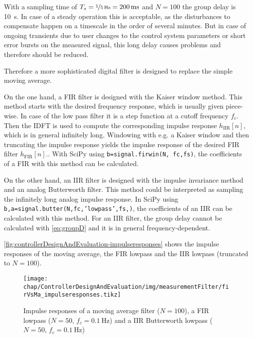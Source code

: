With a sampling time of $T_s=\nicefrac{1}{\SI{5}{\hertz}}=\SI{200}{\milli\second}$ and $N=100$ the group delay is \SI{10}{\second}. In case of a steady operation this is acceptable, as the disturbances to compensate happen on a timescale in the order of several minutes.
But in case of ongoing transients due to user changes to the control system parameters or short error bursts on the measured signal, this long delay causes problems and therefore should be reduced.

Therefore a more sophisticated digital filter is designed to replace the simple moving average.

On the one hand, a FIR filter is designed with the Kaiser window method.
This method starts with the desired frequency response, which is usually given piece-wise. 
In case of the low pass filter it is a step function at a cutoff frequency $f_c$.
Then the IDFT is used to compute the corresponding impulse response $h_\text{IIR}[n]$, which is in general infinitely long.
Windowing with e.g. a Kaiser window and then truncating the impulse response yields the impulse response of the desired FIR filter $h_\text{FIR}[n]$.\cite[p.~533]{Oppenheim2010}.
With SciPy using \texttt{b=signal.firwin(N, fc,fs)}, the coefficients of a FIR with this method can be calculated.

On the other hand, an IIR filter is designed with the impulse invariance method and an analog Butterworth filter.
This method could be interpreted as sampling the infinitely long analog impulse response.\cite[p.~497]{Oppenheim2010}
In SciPy using \texttt{b,a=signal.butter(N,fc,'lowpass',fs,)}, the coefficients of an IIR can be calculated with this method.
For an IIR filter, the group delay cannot be calculated with \autoref{eq:groupD} and it is in general frequency-dependent.

\autoref{fig:controllerDesignAndEvaluation-impulseresponses} shows the impulse responses of the moving average, the FIR lowpass and the IIR lowpass (truncated to $N=100$).

\begin{figure}[tb]
	\centering
	\texttt{[image: chap/ControllerDesignAndEvaluation/img/measurementFilter/firVsMa\_impulseresponses.tikz]}
	\caption{Impulse responses of a moving average filter ($N=100$), a FIR lowpass ($N=50$, $f_c=\SI{0.1}{\hertz}$) and a IIR Butterworth lowpass ($N=50$, $f_c=\SI{0.1}{\hertz}$)}
	\label{fig:controllerDesignAndEvaluation-impulseresponses}
\end{figure}

